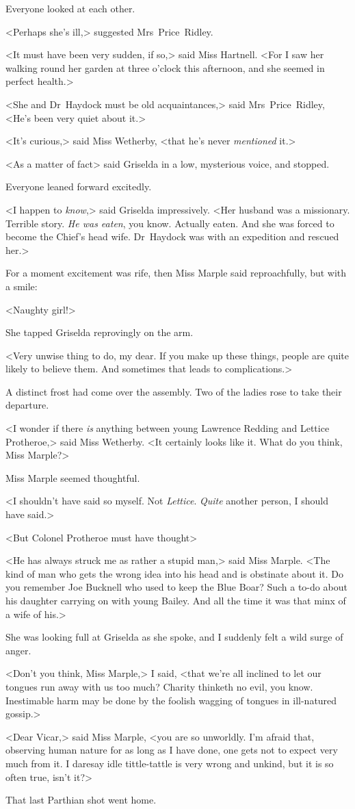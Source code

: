Everyone looked at each other.

<Perhaps she's ill,> suggested Mrs~Price~Ridley.

<It must have been very sudden, if so,> said Miss Hartnell. <For I saw her walking round her garden at three o'clock this afternoon, and she seemed in perfect health.>

<She and Dr~Haydock must be old acquaintances,> said Mrs~Price~Ridley, <He's been very quiet about it.>

<It's curious,> said Miss Wetherby, <that he's never \emph{mentioned} it.>

<As a matter of fact\longdash> said Griselda in a low, mysterious voice, and stopped.

Everyone leaned forward excitedly.

<I happen to \emph{know},> said Griselda impressively. <Her husband was a missionary. Terrible story. \emph{He was eaten}, you know. Actually eaten. And she was forced to become the Chief's head wife. Dr~Haydock was with an expedition and rescued her.>

For a moment excitement was rife, then Miss Marple said reproachfully, but with a smile:

<Naughty girl!>

She tapped Griselda reprovingly on the arm.

<Very unwise thing to do, my dear. If you make up these things, people are quite likely to believe them. And sometimes that leads to complications.>

A distinct frost had come over the assembly. Two of the ladies rose to take their departure.

<I wonder if there \emph{is} anything between young Lawrence Redding and Lettice Protheroe,> said Miss Wetherby. <It certainly looks like it. What do you think, Miss Marple?>

Miss Marple seemed thoughtful.

<I shouldn't have said so myself. Not \emph{Lettice}. \emph{Quite} another person, I should have said.>

<But Colonel Protheroe must have thought\longdash>

<He has always struck me as rather a stupid man,> said Miss Marple. <The kind of man who gets the wrong idea into his head and is obstinate about it. Do you remember Joe Bucknell who used to keep the Blue Boar? Such a to-do about his daughter carrying on with young Bailey. And all the time it was that minx of a wife of his.>

She was looking full at Griselda as she spoke, and I suddenly felt a wild surge of anger.

<Don't you think, Miss Marple,> I said, <that we're all inclined to let our tongues run away with us too much? Charity thinketh no evil, you know. Inestimable harm may be done by the foolish wagging of tongues in ill-natured gossip.>

<Dear Vicar,> said Miss Marple, <you are so unworldly. I'm afraid that, observing human nature for as long as I have done, one gets not to expect very much from it. I daresay idle tittle-tattle is very wrong and unkind, but it is so often true, isn't it?>

That last Parthian shot went home.